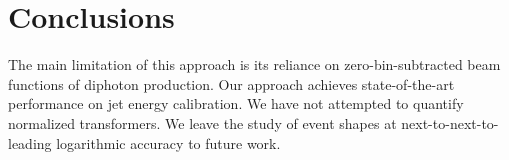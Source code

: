 \section{Conclusions}\label{sec:conclusions}

The main limitation of this approach is its reliance on
zero-bin-subtracted beam functions of diphoton production. Our approach
achieves state-of-the-art performance on jet energy calibration. We have
not attempted to quantify normalized transformers. We leave the study of
event shapes at next-to-next-to-leading logarithmic accuracy to future
work.

